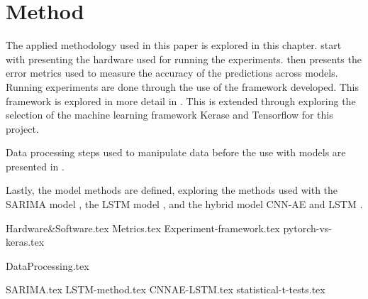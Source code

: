 \chapter{Method}
\label{section:Method}

The applied methodology used in this paper is explored in this chapter.
 start with presenting the hardware used for running the experiments.
 then presents the error metrics used to measure the accuracy of the predictions across models.
Running experiments are done through the use of the framework developed. This framework is explored in more detail in .
This is extended through  exploring the selection of the machine learning framework Kerase and Tensorflow for this project.

Data processing steps used to manipulate data before the use with models are presented in .

Lastly, the model methods are defined, exploring the methods used with the SARIMA model , the LSTM model ,
and the hybrid model CNN-AE and LSTM .


{Hardware&Software.tex}
{Metrics.tex}
{Experiment-framework.tex}
{pytorch-vs-keras.tex}

{DataProcessing.tex}

{SARIMA.tex}
{LSTM-method.tex}
{CNNAE-LSTM.tex}
{statistical-t-tests.tex}
